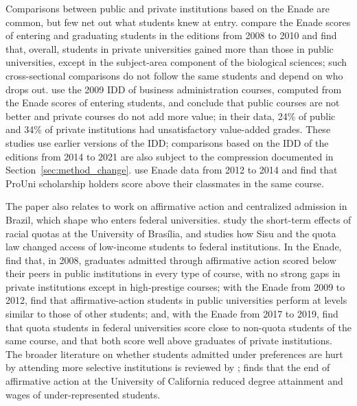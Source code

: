 \documentclass[11pt,a4paper]{article}
\begin{document}
Comparisons between public and private institutions based on the Enade are common, but few net out what students knew at entry. \citet{melguizo2016} compare the Enade scores of entering and graduating students in the editions from 2008 to 2010 and find that, overall, students in private universities gained more than those in public universities, except in the subject-area component of the biological sciences; such cross-sectional comparisons do not follow the same students and depend on who drops out. \citet{garcia2014} use the 2009 IDD of business administration courses, computed from the Enade scores of entering students, and conclude that public courses are not better and private courses do not add more value; in their data, 24\% of public and 34\% of private institutions had unsatisfactory value-added grades. These studies use earlier versions of the IDD; comparisons based on the IDD of the editions from 2014 to 2021 are also subject to the compression documented in Section~\ref{sec:method_change}. \citet{wainer2018} use Enade data from 2012 to 2014 and find that ProUni scholarship holders score above their classmates in the same course.

The paper also relates to work on affirmative action and centralized admission in Brazil, which shape who enters federal universities. \citet{francis2012} study the short-term effects of racial quotas at the University of Bras\'{i}lia, and \citet{mello2022} studies how Sisu and the quota law changed access of low-income students to federal institutions. In the Enade, \citet{waltenberg2013} find that, in 2008, graduates admitted through affirmative action scored below their peers in public institutions in every type of course, with no strong gaps in private institutions except in high-prestige courses; with the Enade from 2009 to 2012, \citet{valente2017} find that affirmative-action students in public universities perform at levels similar to those of other students; and, with the Enade from 2017 to 2019, \citet{bielschowsky2023} find that quota students in federal universities score close to non-quota students of the same course, and that both score well above graduates of private institutions. The broader literature on whether students admitted under preferences are hurt by attending more selective institutions is reviewed by \citet{arcidiacono2016}; \citet{bleemer2022} finds that the end of affirmative action at the University of California reduced degree attainment and wages of under-represented students.

\end{document}
